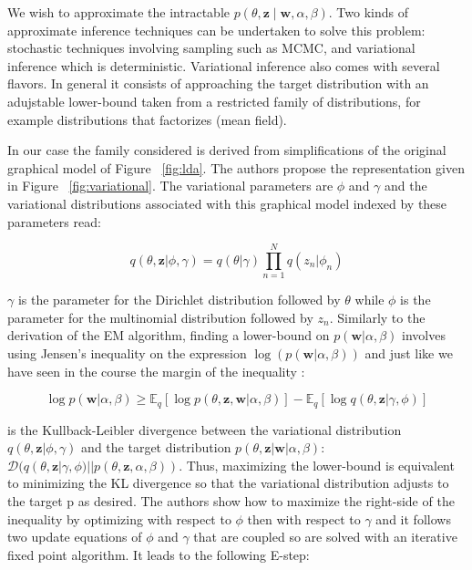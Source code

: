 \documentclass[12pt,a4paper,onecolumn]{article}
\begin{document}
We wish to approximate the intractable $p(\theta, \mathbf{z} \mid \mathbf{w}, \alpha, \beta)$. Two kinds of approximate inference techniques can be undertaken to solve this problem: stochastic techniques involving sampling such as MCMC, and variational inference which is deterministic. Variational inference also comes with several flavors. In general it consists of approaching the target distribution with an adujstable lower-bound taken from a restricted family of distributions, for example distributions that factorizes (mean field).

In our case the family considered is derived from simplifications of the original graphical model of Figure ~\ref{fig:lda}. The authors propose the representation given in Figure ~\ref{fig:variational}. The variational parameters are $\phi$ and $\gamma$ and the variational distributions associated with this graphical model indexed by these parameters read:

\begin{equation*}
	q(\theta, \mathbf{z}|\phi, \gamma) = q(\theta|\gamma)\prod_{n=1}^N q(z_n|\phi_n)
\end{equation*}


$\gamma$ is the parameter for the Dirichlet distribution followed by $\theta$ while $\phi$ is the parameter for the multinomial distribution followed by $z_n$. Similarly to the derivation of the EM algorithm, finding a lower-bound on $p(\mathbf{w}|\alpha, \beta)$ involves using Jensen's inequality on the expression $\log (p(\mathbf{w}|\alpha, \beta))$ and just like we have seen in the course the margin of the inequality :

\begin{equation}
	\log p(\mathbf{w}|\alpha, \beta) \geq \mathbb{E}_q[\log p(\theta, \mathbf{z}, \mathbf{w}|\alpha, \beta)] - \mathbb{E}_q[\log q(\theta,\mathbf{z}|\gamma, \phi)] \label{eq_llh}
\end{equation}


is the Kullback-Leibler divergence between the variational distribution $q(\theta, \mathbf{z}|\phi, \gamma)$ and the target distribution $p(\theta, \mathbf{z}|\mathbf{w}|\alpha, \beta)$: $\mathcal{D}(q(\theta, \mathbf{z}|\gamma, \phi)||p(\theta, \mathbf{z}, \alpha, \beta))$. Thus, maximizing the lower-bound is equivalent to minimizing the KL divergence so that the variational distribution adjusts to the target p as desired. The authors show how to maximize the right-side of the inequality by optimizing with respect to $\phi$ then with respect to $\gamma$ and it follows two update equations of $\phi$
and $\gamma$ that are coupled so are solved with an iterative fixed point algorithm. It leads to the following E-step:
\end{document}
